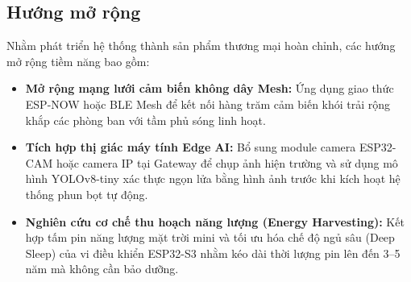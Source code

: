 \subsection{Hướng mở rộng}
Nhằm phát triển hệ thống thành sản phẩm thương mại hoàn chỉnh, các hướng mở rộng tiềm năng bao gồm:
\begin{itemize}
    \item \textbf{Mở rộng mạng lưới cảm biến không dây Mesh:} Ứng dụng giao thức ESP-NOW hoặc BLE Mesh để kết nối hàng trăm cảm biến khói trải rộng khắp các phòng ban với tầm phủ sóng linh hoạt.
    \item \textbf{Tích hợp thị giác máy tính Edge AI:} Bổ sung module camera ESP32-CAM hoặc camera IP tại Gateway để chụp ảnh hiện trường và sử dụng mô hình YOLOv8-tiny xác thực ngọn lửa bằng hình ảnh trước khi kích hoạt hệ thống phun bọt tự động.
    \item \textbf{Nghiên cứu cơ chế thu hoạch năng lượng (Energy Harvesting):} Kết hợp tấm pin năng lượng mặt trời mini và tối ưu hóa chế độ ngủ sâu (Deep Sleep) của vi điều khiển ESP32-S3 nhằm kéo dài thời lượng pin lên đến 3--5 năm mà không cần bảo dưỡng.
\end{itemize}
